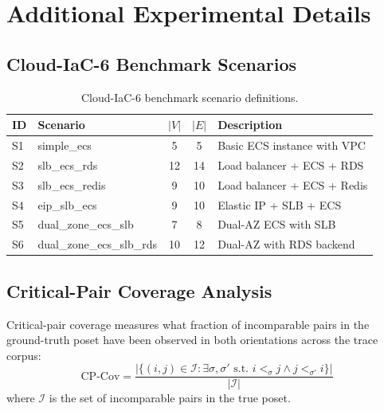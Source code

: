 
\appendix
\section{Additional Experimental Details}
\label{app:experiment_details}

\subsection{Cloud-IaC-6 Benchmark Scenarios}
\label{app:scenarios}

\begin{table}[h]
\centering
\caption{Cloud-IaC-6 benchmark scenario definitions.}
\label{tab:aliyun_scenarios_full}
\small
\begin{tabular}{llccl}
\toprule
\textbf{ID} & \textbf{Scenario} & \textbf{$|V|$} & \textbf{$|E|$} & \textbf{Description} \\
\midrule
S1 & simple\_ecs & 5 & 5 & Basic ECS instance with VPC \\
S2 & slb\_ecs\_rds & 12 & 14 & Load balancer + ECS + RDS \\
S3 & slb\_ecs\_redis & 9 & 10 & Load balancer + ECS + Redis \\
S4 & eip\_slb\_ecs & 9 & 10 & Elastic IP + SLB + ECS \\
S5 & dual\_zone\_ecs\_slb & 7 & 8 & Dual-AZ ECS with SLB \\
S6 & dual\_zone\_ecs\_slb\_rds & 10 & 12 & Dual-AZ with RDS backend \\
\bottomrule
\end{tabular}
\end{table}

\subsection{Critical-Pair Coverage Analysis}
\label{app:cpcov}

Critical-pair coverage measures what fraction of incomparable pairs in the ground-truth poset have been observed in both orientations across the trace corpus:
\begin{equation}
\text{CP-Cov} = \frac{|\{(i,j) \in \mathcal{I} : \exists \sigma, \sigma' \text{ s.t. } i <_\sigma j \wedge j <_{\sigma'} i\}|}{|\mathcal{I}|}
\end{equation}
where $\mathcal{I}$ is the set of incomparable pairs in the true poset.

